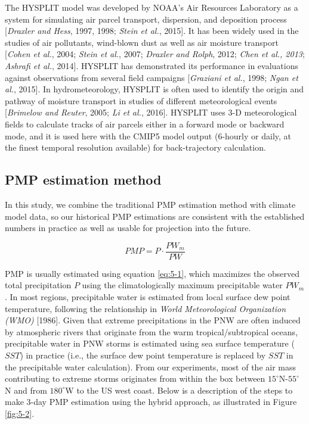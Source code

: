 The HYSPLIT model was developed by NOAA’s Air Resources Laboratory as a system for simulating air parcel transport, dispersion, and deposition process [\textit{Draxler and Hess}, 1997, 1998; \textit{Stein et al.}, 2015]. It has been widely used in the studies of air pollutants, wind-blown dust as well as air moisture transport [\textit{Cohen et al.}, 2004; \textit{Stein et al.}, 2007; \textit{Draxler and Rolph}, 2012; \textit{Chen et al., 2013}; \textit{Ashrafi et al.}, 2014]. HYSPLIT has demonstrated its performance in evaluations against observations from several field campaigns [\textit{Graziani et al.}, 1998; \textit{Ngan et al.}, 2015]. In hydrometeorology, HYSPLIT is often used to identify the origin and pathway of moisture transport in studies of different meteorological events [\textit{Brimelow and Reuter}, 2005;\textit{ Li et al.}, 2016]. HYSPLIT uses 3-D meteorological fields to calculate tracks of air parcels either in a forward mode or backward mode, and it is used here with the CMIP5 model output (6-hourly or daily, at the finest temporal resolution available) for back-trajectory calculation.

\subsection{PMP estimation method}

In this study, we combine the traditional PMP estimation method with climate model data, so our historical PMP estimations are consistent with the established numbers in practice as well as usable for projection into the future.

\begin{equation}
	PMP = P \cdot \frac{{P{W_m}}}{{PW}}
	\label{eq:5-1}
\end{equation}

PMP is usually estimated using equation \ref{eq:5-1}, which maximizes the observed total precipitation $P$ using the climatologically maximum precipitable water $PW_m$. In most regions, precipitable water is estimated from local surface dew point temperature, following the relationship in \textit{World Meteorological Organization (WMO)} [1986]. Given that extreme precipitations in the PNW are often induced by atmospheric rivers that originate from the warm tropical/subtropical oceans, precipitable water in PNW storms is estimated using sea surface temperature ($SST$) in practice (i.e., the surface dew point temperature is replaced by $SST$ in the precipitable water calculation). From our experiments, most of the air mass contributing to extreme storms originates from within the box between $15^{\circ}$N-$55^{\circ}$N and from $180^{\circ}$W to the US west coast. Below is a description of the steps to make 3-day PMP estimation using the hybrid approach, as illustrated in Figure \ref{fig:5-2}.

